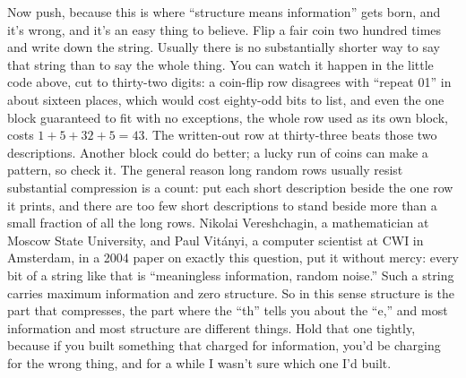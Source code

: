 \documentclass[11pt,twoside]{article}
\theoremstyle{thielethm}
\theoremstyle{thieledef}
\theoremstyle{thieledef}
\theoremstyle{thieledef}
\theoremstyle{thielethm}
\theoremstyle{thieleobs}
\theoremstyle{thielethm}
\begin{document}
Now push, because this is where ``structure means information'' gets born, and it's wrong, and it's an easy thing to believe. Flip a fair coin two hundred times and write down the string. Usually there is no substantially shorter way to say that string than to say the whole thing. You can watch it happen in the little code above, cut to thirty-two digits: a coin-flip row disagrees with ``repeat 01'' in about sixteen places, which would cost eighty-odd bits to list, and even the one block guaranteed to fit with no exceptions, the whole row used as its own block, costs $1 + 5 + 32 + 5 = 43$. The written-out row at thirty-three beats those two descriptions. Another block could do better; a lucky run of coins can make a pattern, so check it. The general reason long random rows usually resist substantial compression is a count: put each short description beside the one row it prints, and there are too few short descriptions to stand beside more than a small fraction of all the long rows. Nikolai Vereshchagin, a mathematician at Moscow State University, and Paul Vitányi, a computer scientist at CWI in Amsterdam, in a 2004 paper on exactly this question, put it without mercy: every bit of a string like that is ``meaningless information, random noise.'' Such a string carries maximum information and zero structure. So in this sense structure is the part that compresses, the part where the ``th'' tells you about the ``e,'' and most information and most structure are different things. Hold that one tightly, because if you built something that charged for information, you'd be charging for the wrong thing, and for a while I wasn't sure which one I'd built.
\end{document}
